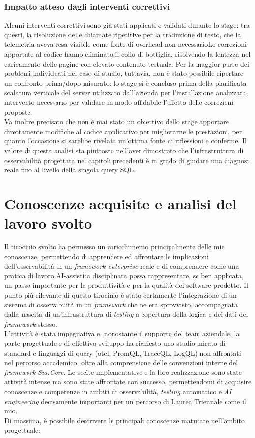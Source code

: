 \subsubsection{Impatto atteso dagli interventi correttivi}

Alcuni interventi correttivi sono già stati applicati e validati durante lo
stage: tra questi, la risoluzione delle chiamate ripetitive per la traduzione
di testo, che la telemetria aveva resa visibile come fonte di overhead non
necessarioLe correzioni apportate al codice hanno eliminato il
collo di bottiglia, risolvendo la lentezza nel caricamento delle pagine con
elevato contenuto testuale. Per la maggior parte dei problemi individuati nel caso di studio,
tuttavia, non è stato possibile riportare un confronto prima/dopo
misurato: lo stage si è concluso prima della pianificata scalatura verticale
del server utilizzato dall'azienda per l'installazione analizzata, intervento
necessario per validare in modo affidabile l'effetto delle correzioni proposte.\\
Va inoltre precisato che non è mai stato un obiettivo dello stage apportare
direttamente modifiche al codice applicativo per migliorarne le prestazioni,
per quanto l'occasione si sarebbe rivelata un'ottima fonte di riflessioni e
conferme. Il valore di questa analisi sta piuttosto nell'aver dimostrato che
l'infrastruttura di osservabilità progettata nei capitoli precedenti è in
grado di guidare una diagnosi reale fino al livello della singola query SQL.

\section{Conoscenze acquisite e analisi del lavoro svolto}

Il tirocinio svolto ha permesso un arricchimento principalmente delle mie conoscenze,
permettendo di apprendere ed affrontare le implicazioni
dell'osservabilità in un \emph{framework enterprise} reale e di comprendere come
una pratica di lavoro AI-assistita disciplinata possa rappresentare, se ben
applicata, un passo importante per la produttività e per la qualità del
software prodotto. Il punto più rilevante di questo tirocinio è stato
certamente l'integrazione di un sistema di osservabilità in un \emph{framework}
che ne era sprovvisto, accompagnata dalla nascita di un'infrastruttura di
\emph{testing} a copertura della logica e dei dati del \emph{framework} stesso.\\
L'attività è stata impegnativa e, nonostante il supporto del team
aziendale, la parte progettuale e di effettivo sviluppo ha richiesto uno studio
mirato di standard e linguaggi di query (\gls{otel}, PromQL, TraceQL, LogQL)
non affrontati nel percorso accademico, oltre alla comprensione delle
convenzioni interne del \emph{framework} \emph{Sia.Core}. Le scelte
implementative e la loro realizzazione sono state attività intense ma sono state
affrontate con successo, permettendomi di acquisire conoscenze e competenze in
ambiti di osservabilità, \emph{testing} automatico e \emph{AI engineering}
decisamente importanti per un percorso di Laurea Triennale come il mio.\\
Di massima, è possibile descrivere le principali conoscenze maturate
nell'ambito progettuale:

